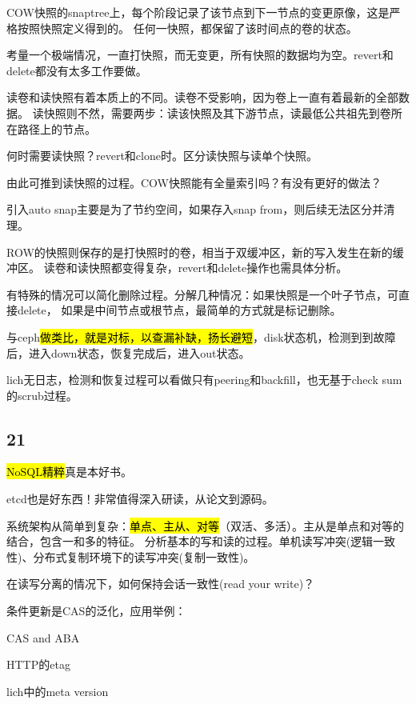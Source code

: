 COW快照的snaptree上，每个阶段记录了该节点到下一节点的变更原像，这是严格按照快照定义得到的。
任何一快照，都保留了该时间点的卷的状态。

考量一个极端情况，一直打快照，而无变更，所有快照的数据均为空。revert和delete都没有太多工作要做。

读卷和读快照有着本质上的不同。读卷不受影响，因为卷上一直有着最新的全部数据。
读快照则不然，需要两步：读该快照及其下游节点，读最低公共祖先到卷所在路径上的节点。

何时需要读快照？revert和clone时。区分读快照与读单个快照。

由此可推到读快照的过程。COW快照能有全量索引吗？有没有更好的做法？

引入auto snap主要是为了节约空间，如果存入snap from，则后续无法区分并清理。

\hrulefill

ROW的快照则保存的是打快照时的卷，相当于双缓冲区，新的写入发生在新的缓冲区。
读卷和读快照都变得复杂，revert和delete操作也需具体分析。

有特殊的情况可以简化删除过程。分解几种情况：如果快照是一个叶子节点，可直接delete，
如果是中间节点或根节点，最简单的方式就是标记删除。

\hrulefill

与ceph\hl{做类比，就是对标，以查漏补缺，扬长避短}，disk状态机，检测到到故障后，进入down状态，恢复完成后，进入out状态。

lich无日志，检测和恢复过程可以看做只有peering和backfill，也无基于check sum的scrub过程。

\subsection{21}

\hl{NoSQL精粹}真是本好书。

etcd也是好东西！非常值得深入研读，从论文到源码。

系统架构从简单到复杂：\hl{单点、主从、对等}（双活、多活）。主从是单点和对等的结合，包含一和多的特征。
分析基本的写和读的过程。单机读写冲突(逻辑一致性)、分布式复制环境下的读写冲突(复制一致性)。

在读写分离的情况下，如何保持会话一致性(read your write)？

条件更新是CAS的泛化，应用举例：
\begin{enumbox}
\item CAS and ABA
\item HTTP的etag
\item lich中的meta version
\end{enumbox}

